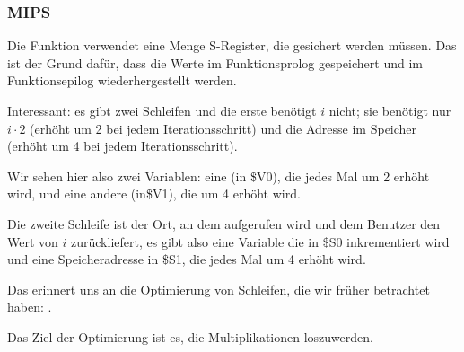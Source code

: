 \subsubsection{MIPS}
Die Funktion verwendet eine Menge S-Register, die gesichert werden müssen. Das ist der Grund dafür, dass die Werte im
Funktionsprolog gespeichert und im Funktionsepilog wiederhergestellt werden.


Interessant: es gibt zwei Schleifen und die erste benötigt $i$ nicht; sie benötigt nur $i\cdot 2$ (erhöht um 2 bei
jedem Iterationsschritt) und die Adresse im Speicher (erhöht um 4 bei jedem Iterationsschritt).

Wir sehen hier also zwei Variablen: eine (in \$V0), die jedes Mal um 2 erhöht wird, und eine andere (in\$V1), die um 4
erhöht wird.

Die zweite Schleife ist der Ort, an dem \printf aufgerufen wird und dem Benutzer den Wert von $i$ zurückliefert, es gibt
also eine Variable die in \$S0 inkrementiert wird und eine Speicheradresse in \$S1, die jedes Mal um 4 erhöht wird.

Das erinnert uns an die Optimierung von Schleifen, die wir früher betrachtet haben: .

Das Ziel der Optimierung ist es, die Multiplikationen loszuwerden.